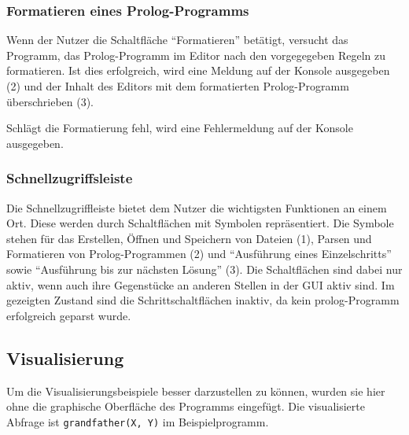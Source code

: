 \documentclass[parskip=full,11pt,twoside]{scrartcl}
\begin{document}
\subsubsection{Formatieren eines Prolog-Programms}

\begin{minipage}{\linewidth}
\end{minipage}

Wenn der Nutzer die Schaltfläche \enquote{Formatieren} betätigt, versucht das Programm, das Prolog-Programm im Editor nach den vorgegegeben Regeln zu formatieren.
Ist dies erfolgreich, wird eine Meldung auf der Konsole ausgegeben (2) und der Inhalt des Editors mit dem formatierten Prolog-Programm überschrieben (3).

Schlägt die Formatierung fehl, wird eine Fehlermeldung auf der Konsole ausgegeben.

\subsubsection{Schnellzugriffsleiste}

\begin{minipage}{\linewidth}
\end{minipage}

Die Schnellzugriffleiste bietet dem Nutzer die wichtigsten Funktionen an einem Ort.
Diese werden durch Schaltflächen mit Symbolen repräsentiert.
Die Symbole stehen für das Erstellen, Öffnen und Speichern von Dateien (1), Parsen und Formatieren von Prolog-Programmen (2) und \enquote{Ausführung eines Einzelschritts} sowie \enquote{Ausführung bis zur nächsten Lösung} (3).
Die Schaltflächen sind dabei nur aktiv, wenn auch ihre Gegenstücke an anderen Stellen in der GUI aktiv sind.
Im gezeigten Zustand sind die Schrittschaltflächen inaktiv, da kein prolog-Programm erfolgreich geparst wurde.

\subsection{Visualisierung}

Um die Visualisierungsbeispiele besser darzustellen zu können, wurden sie hier ohne die graphische Oberfläche des Programms eingefügt.
Die visualisierte Abfrage ist \texttt{grandfather(X, Y)} im Beispielprogramm.
\end{document}
